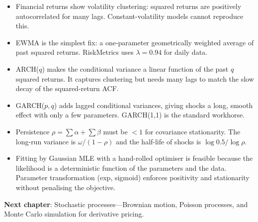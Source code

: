 \begin{itemize}
    \item Financial returns show volatility clustering: squared returns are
      positively autocorrelated for many lags. Constant-volatility models
      cannot reproduce this.
    \item EWMA is the simplest fix: a one-parameter geometrically weighted
      average of past squared returns. RiskMetrics uses $\lambda = 0.94$ for
      daily data.
    \item ARCH($q$) makes the conditional variance a linear function of the
      past $q$ squared returns. It captures clustering but needs many lags to
      match the slow decay of the squared-return ACF.
    \item GARCH($p, q$) adds lagged conditional variances, giving shocks a
      long, smooth effect with only a few parameters. GARCH(1,1) is the
      standard workhorse.
    \item Persistence $\rho = \sum\alpha + \sum\beta$ must be $< 1$ for
      covariance stationarity. The long-run variance is
      $\omega / (1 - \rho)$ and the half-life of shocks is
      $\log 0.5 / \log \rho$.
    \item Fitting by Gaussian MLE with a hand-rolled optimiser is feasible
      because the likelihood is a deterministic function of the parameters
      and the data. Parameter transformation (exp, sigmoid) enforces
      positivity and stationarity without penalising the objective.
\end{itemize}

\vspace{1em}
\noindent\textbf{Next chapter}: Stochastic processes---Brownian motion, Poisson
processes, and Monte Carlo simulation for derivative pricing.